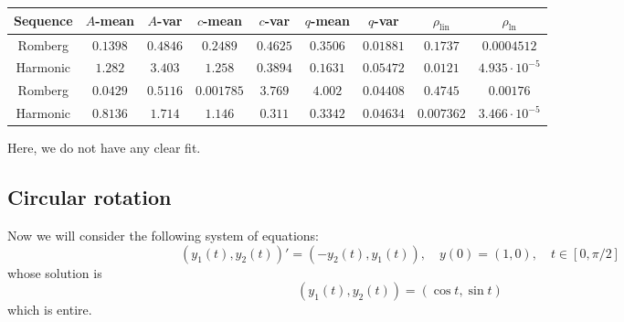 \begin{table}[H]
    \centering
    \small
    \begin{tabular}{c||c|c|c|c|c|c|c|c}
Sequence & \(A\)-mean & \(A\)-var & \(c\)-mean & \(c\)-var & \(q\)-mean & \(q\)-var & \(\rho_{\operatorname{lin}}\) & \(\rho_{\ln}\)\\\hline
\rowcolor{red}
Romberg & \(0.1398\) & \(0.4846\) & \(0.2489\) & \(0.4625\) & \(0.3506\) & \(0.01881\) & \(0.1737\) & \(0.0004512\) \\
\rowcolor{red}
Harmonic & \(1.282\) & \(3.403\) & \(1.258\) & \(0.3894\) & \(0.1631\) & \(0.05472\) & \(0.0121\) & \(4.935\cdot 10^{-5}\) \\
\rowcolor{red}
Romberg & \(0.0429\) & \(0.5116\) & \(0.001785\) & \(3.769\) & \(4.002\) & \(0.04408\) & \(0.4745\) & \(0.00176\) \\
\rowcolor{red}
Harmonic & \(0.8136\) & \(1.714\) & \(1.146\) & \(0.311\) & \(0.3342\) & \(0.04634\) & \(0.007362\) & \(3.466\cdot 10^{-5}\) \\
    \end{tabular}
    \label{tab:my_label}
\end{table}

Here, we do not have any clear fit.

\subsection{Circular rotation}

Now we will consider the following system of equations:
\begin{equation}\label{48}
(y_1(t),y_2(t))' = (-y_2(t), y_1(t)), \quad y(0) = (1,0), \quad t\in [0,\pi /2]
\end{equation}
whose solution is 
\[
(y_1(t),y_2(t)) = (\cos t, \sin t)
\]
which is entire.

